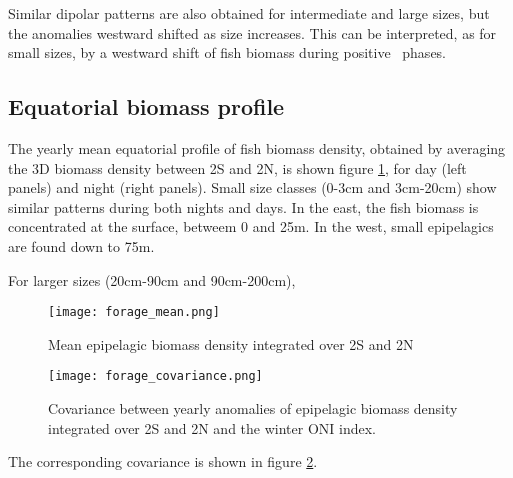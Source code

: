 Similar dipolar patterns are also obtained for intermediate and large sizes, but the anomalies westward shifted as size increases. This can be interpreted, as for small sizes, by a westward shift of fish biomass during positive \nino\ phases.\\

\subsection{Equatorial biomass profile}

The yearly mean equatorial profile of fish biomass density, obtained by averaging the 3D biomass density between 2\degree S and 2\degree N, 
is shown figure \ref{fig:mean-forage}, for day (left panels) and night (right panels). Small size classes (0-3cm and 3cm-20cm) show similar 
patterns during both nights and days. In the east, the fish biomass is concentrated at the surface, betweem 0 and 25m. In the west, small epipelagics
are found down to 75m. 

For larger sizes (20cm-90cm and 90cm-200cm),

\begin{figure}[h!]
    \centering	
    \texttt{[image: forage\_mean.png]}
	\caption{Mean epipelagic biomass density integrated over 2\degree S and 2\degree N}
    \label{fig:mean-forage}
\end{figure}

\begin{figure}[h!]
    \centering
    \texttt{[image: forage\_covariance.png]}
	\caption{Covariance between yearly anomalies of epipelagic biomass density integrated over 2\degree S and 2\degree N and the winter ONI index.}
    \label{fig:covariance-forage}
\end{figure}

The corresponding covariance is shown in figure \ref{fig:covariance-forage}.

%
%

\clearpage
